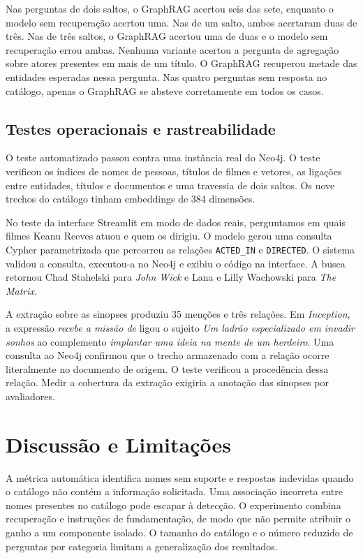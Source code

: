 \documentclass[12pt]{article}
\begin{document}
Nas perguntas de dois saltos, o GraphRAG acertou seis das sete, enquanto o modelo sem recuperação acertou uma. Nas de um salto, ambos acertaram duas de três. Nas de três saltos, o GraphRAG acertou uma de duas e o modelo sem recuperação errou ambas. Nenhuma variante acertou a pergunta de agregação sobre atores presentes em mais de um título. O GraphRAG recuperou metade das entidades esperadas nessa pergunta. Nas quatro perguntas sem resposta no catálogo, apenas o GraphRAG se absteve corretamente em todos os casos.

\subsection{Testes operacionais e rastreabilidade}
O teste automatizado passou contra uma instância real do Neo4j. O teste verificou os índices de nomes de pessoas, títulos de filmes e vetores, as ligações entre entidades, títulos e documentos e uma travessia de dois saltos. Os nove trechos do catálogo tinham embeddings de 384 dimensões.

No teste da interface Streamlit em modo de dados reais, perguntamos em quais filmes Keanu Reeves atuou e quem os dirigiu. O modelo gerou uma consulta Cypher parametrizada que percorreu as relações \texttt{ACTED\_IN} e \texttt{DIRECTED}. O sistema validou a consulta, executou-a no Neo4j e exibiu o código na interface. A busca retornou Chad Stahelski para \emph{John Wick} e Lana e Lilly Wachowski para \emph{The Matrix}.

A extração sobre as sinopses produziu 35 menções e três relações. Em \emph{Inception}, a expressão \emph{recebe a missão de} ligou o sujeito \emph{Um ladrão especializado em invadir sonhos} ao complemento \emph{implantar uma ideia na mente de um herdeiro}. Uma consulta ao Neo4j confirmou que o trecho armazenado com a relação ocorre literalmente no documento de origem. O teste verificou a procedência dessa relação. Medir a cobertura da extração exigiria a anotação das sinopses por avaliadores.

\section{Discussão e Limitações}
A métrica automática identifica nomes sem suporte e respostas indevidas quando o catálogo não contém a informação solicitada. Uma associação incorreta entre nomes presentes no catálogo pode escapar à detecção. O experimento combina recuperação e instruções de fundamentação, de modo que não permite atribuir o ganho a um componente isolado. O tamanho do catálogo e o número reduzido de perguntas por categoria limitam a generalização dos resultados.
\end{document}
